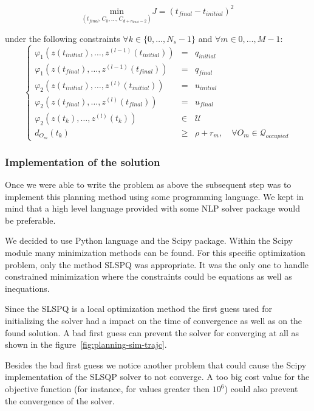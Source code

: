 \begin{equation}\label{eq:objective}
	\underset{(t_{final},C_0,\dotsc,C_{d+n_{knot}-2})}{\mathrm{min}} J = (t_{final}-t_{initial})^{2}
\end{equation}

under the following constraints $\forall k \in \{0,\dotsc,N_s -1\}$ and $\forall m \in {0,\dotsc,M-1}$:
\begin{equation}%
\left\lbrace\begin{array}{lcl}
    \varphi_1(z(t_{initial}),\dotsc,z^{(l-1)}(t_{initial})) & = & q_{initial}\\
    \varphi_1(z(t_{final}),\dotsc,z^{(l-1)}(t_{final})) & = & q_{final}\\
    \varphi_2(z(t_{initial}),\dotsc,z^{(l)}(t_{initial})) & = & u_{initial}\\
    \varphi_2(z(t_{final}),\dotsc,z^{(l)}(t_{final}))& = & u_{final}\\
    \varphi_2(z(t_k),\dotsc,z^{(l)}(t_k)) &\in& \mathcal{U}\\
    d_{O_m}(t_k) &\geq& \rho + r_m,\quad \forall O_m \in \mathcal{Q}_{occupied}
\end{array}\right.
\end{equation}

\subsubsection{Implementation of the solution}

Once we were able to write the problem as above the subsequent step was to implement this planning method using some programming language. We kept in mind that a high level language provided with some NLP solver package would be preferable.

We decided to use Python language and the Scipy package. Within the Scipy module many minimization methods can be found. For this specific optimization problem, only the method SLSPQ was appropriate. It was the only one to handle constrained minimization where the constraints could be equations as well as inequations.

Since the SLSPQ is a local optimization method the first guess used for initializing the solver had a impact on the time of convergence as well as on the found solution. A bad first guess can prevent the solver for converging at all as shown in the figure~\ref{fig:planning-sim-trajc}.

Besides the bad first guess we notice another problem that could cause the Scipy implementation of the SLSQP solver to not converge. A too big cost value for the objective function (for instance, for values greater then $10^6$) could also prevent the convergence of the solver.

